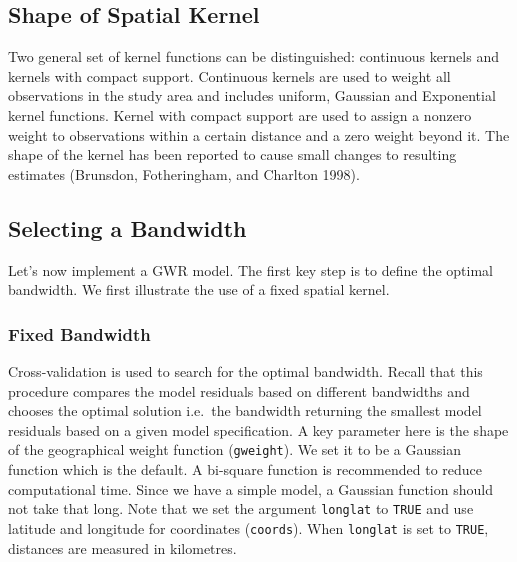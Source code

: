 \documentclass[
  letterpaper,
  krantz2]{style/krantz}
\begin{document}
\hypertarget{shape-of-spatial-kernel}{%
\subsection{Shape of Spatial Kernel}\label{shape-of-spatial-kernel}}

Two general set of kernel functions can be distinguished: continuous
kernels and kernels with compact support. Continuous kernels are used to
weight all observations in the study area and includes uniform, Gaussian
and Exponential kernel functions. Kernel with compact support are used
to assign a nonzero weight to observations within a certain distance and
a zero weight beyond it. The shape of the kernel has been reported to
cause small changes to resulting estimates (Brunsdon, Fotheringham, and
Charlton 1998).

\hypertarget{selecting-a-bandwidth}{%
\subsection{Selecting a Bandwidth}\label{selecting-a-bandwidth}}

Let's now implement a GWR model. The first key step is to define the
optimal bandwidth. We first illustrate the use of a fixed spatial
kernel.

\hypertarget{fixed-bandwidth}{%
\subsubsection{Fixed Bandwidth}\label{fixed-bandwidth}}

Cross-validation is used to search for the optimal bandwidth. Recall
that this procedure compares the model residuals based on different
bandwidths and chooses the optimal solution i.e.~the bandwidth returning
the smallest model residuals based on a given model specification. A key
parameter here is the shape of the geographical weight function
(\texttt{gweight}). We set it to be a Gaussian function which is the
default. A bi-square function is recommended to reduce computational
time. Since we have a simple model, a Gaussian function should not take
that long. Note that we set the argument \texttt{longlat} to
\texttt{TRUE} and use latitude and longitude for coordinates
(\texttt{coords}). When \texttt{longlat} is set to \texttt{TRUE},
distances are measured in kilometres.
\end{document}

